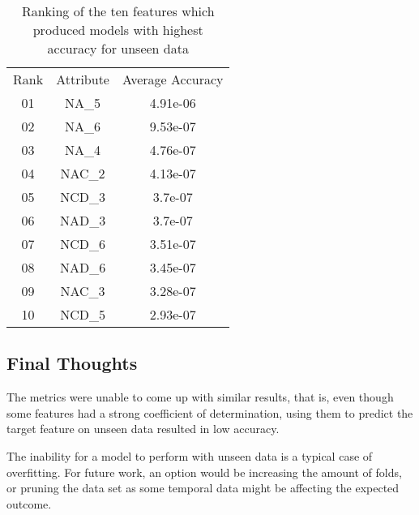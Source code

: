 \documentclass[11pt]{article}
\begin{document}
\begin{table}[h!]
\centering
\normalsize\begin{tabulary}{1.0\textwidth}{CCC}
Rank & Attribute & Average Accuracy \\
01 & NA\_5 & 4.91e-06 \\
02 & NA\_6 & 9.53e-07 \\
03 & NA\_4 & 4.76e-07 \\
04 & NAC\_2 & 4.13e-07 \\
05 & NCD\_3 & 3.7e-07 \\
06 & NAD\_3 & 3.7e-07 \\
07 & NCD\_6 & 3.51e-07 \\
08 & NAD\_6 & 3.45e-07 \\
09 & NAC\_3 & 3.28e-07 \\
10 & NCD\_5 & 2.93e-07 \\
\end{tabulary}
\caption{{Ranking of the ten features which produced models with highest accuracy
for unseen data
{\label{987099}}%
}}
\end{table}\subsection {Final Thoughts}
\label{final}
The metrics were unable to come up with similar results, that is, even though some features had a strong coefficient of determination, using them to predict the target feature on unseen data resulted in low accuracy.

The inability for a model to perform with unseen data is a typical case of overfitting. For future work, an option would be increasing the amount of folds, or pruning the data set as some temporal data might be affecting the expected outcome.

\FloatBarrier
\nocite{*}



\end{document}
